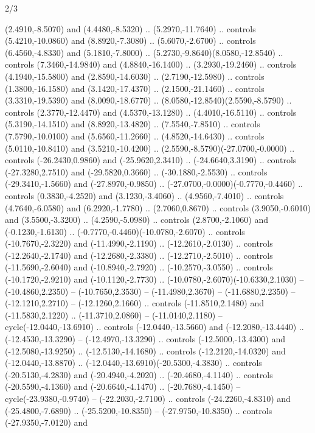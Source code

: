\begin{flagdescription}{2/3}
\begin{scope}[xshift=0.5\flaglength,yshift=0.5\flagwidth,scale=\flagwidth/480]
\begin{scope}[y=0.80pt, x=0.80pt, yscale=-1,shift={(-450,-300)}]
  (2.4910,-8.5070) and (4.4480,-8.5320) .. (5.2970,-11.7640) .. controls
  (5.4210,-10.0860) and (8.8920,-7.3080) .. (5.6070,-2.6700) .. controls
  (6.4560,-4.8330) and (5.1810,-7.8000) .. (5.2730,-9.8640)(8.0580,-12.8540) ..
  controls (7.3460,-14.9840) and (4.8840,-16.1400) .. (3.2930,-19.2460) ..
  controls (4.1940,-15.5800) and (2.8590,-14.6030) .. (2.7190,-12.5980) ..
  controls (1.3800,-16.1580) and (3.1420,-17.4370) .. (2.1500,-21.1460) ..
  controls (3.3310,-19.5390) and (8.0090,-18.6770) ..
  (8.0580,-12.8540)(2.5590,-8.5790) .. controls (2.3770,-12.4470) and
  (4.5370,-13.1280) .. (4.4010,-16.5110) .. controls (5.3190,-14.1510) and
  (8.8920,-13.4820) .. (7.5540,-7.8510) .. controls (7.5790,-10.0100) and
  (5.6560,-11.2660) .. (4.8520,-14.6430) .. controls (5.0110,-10.8410) and
  (3.5210,-10.4200) .. (2.5590,-8.5790)(-27.0700,-0.0000) .. controls
  (-26.2430,0.9860) and (-25.9620,2.3410) .. (-24.6640,3.3190) .. controls
  (-27.3280,2.7510) and (-29.5820,0.3660) .. (-30.1880,-2.5530) .. controls
  (-29.3410,-1.5660) and (-27.8970,-0.9850) ..
  (-27.0700,-0.0000)(-0.7770,-0.4460) .. controls (0.3830,-4.2520) and
  (3.1230,-3.4060) .. (4.9560,-7.4010) .. controls (4.7640,-6.0580) and
  (6.2920,-1.7780) .. (2.7060,0.8670) .. controls (3.9050,-0.6010) and
  (3.5500,-3.3200) .. (4.2590,-5.0980) .. controls (2.8700,-2.1060) and
  (-0.1230,-1.6130) .. (-0.7770,-0.4460)(-10.0780,-2.6070) .. controls
  (-10.7670,-2.3220) and (-11.4990,-2.1190) .. (-12.2610,-2.0130) .. controls
  (-12.2640,-2.1740) and (-12.2680,-2.3380) .. (-12.2710,-2.5010) .. controls
  (-11.5690,-2.6040) and (-10.8940,-2.7920) .. (-10.2570,-3.0550) .. controls
  (-10.1720,-2.9210) and (-10.1120,-2.7730) ..
  (-10.0780,-2.6070)(-10.6330,2.1030) -- (-10.4860,2.2350) -- (-10.7650,2.3530)
  -- (-11.4980,2.3670) -- (-11.6880,2.2350) -- (-12.1210,2.2710) --
  (-12.1260,2.1660) .. controls (-11.8510,2.1480) and (-11.5830,2.1220) ..
  (-11.3710,2.0860) -- (-11.0140,2.1180) -- cycle(-12.0440,-13.6910) .. controls
  (-12.0440,-13.5660) and (-12.2080,-13.4440) .. (-12.4530,-13.3290) --
  (-12.4970,-13.3290) .. controls (-12.5000,-13.4300) and (-12.5080,-13.9250) ..
  (-12.5130,-14.1680) .. controls (-12.2120,-14.0320) and (-12.0440,-13.8870) ..
  (-12.0440,-13.6910)(-20.5300,-4.3830) .. controls (-20.5130,-4.2830) and
  (-20.4940,-4.2020) .. (-20.4680,-4.1140) .. controls (-20.5590,-4.1360) and
  (-20.6640,-4.1470) .. (-20.7680,-4.1450) -- cycle(-23.9380,-0.9740) --
  (-22.2030,-2.7100) .. controls (-24.2260,-4.8310) and (-25.4800,-7.6890) ..
  (-25.5200,-10.8350) -- (-27.9750,-10.8350) .. controls (-27.9350,-7.0120) and

\end{scope}
\end{scope}
\end{flagdescription}
